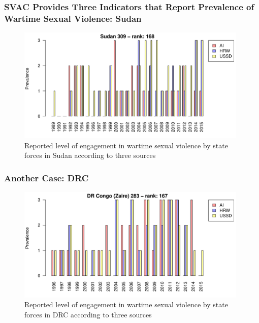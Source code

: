 \documentclass[xcolor=dvipsnames,12pt]{beamer} %
\begin{document}
\begin{frame}[label=SUDAN-obs]
\frametitle{SVAC Provides Three Indicators that Report Prevalence of Wartime Sexual Violence: Sudan}
\begin{figure}\centering
\includegraphics[width=11cm]{../visualize/output/bp-obs-GOV-Sudan-309.pdf}
\caption{Reported level of engagement in wartime sexual violence by state forces in Sudan according to three sources \hyperlink{SUDAN-static}{}}
\end{figure}
\end{frame}


\begin{frame}[label=DRC-obs]
\frametitle{Another Case: DRC }
\begin{figure}\centering
\includegraphics[width=11cm]{../visualize/output/bp-obs-GOV-DR-Congo-Zaire-283.pdf}
\caption{Reported level of engagement in wartime sexual violence by state forces in DRC according to three sources \hyperlink{DRC-static}{}}
\end{figure}
\end{frame}

\end{document}
